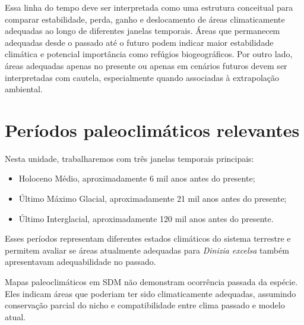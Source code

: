 Essa linha do tempo deve ser interpretada como uma estrutura conceitual para
comparar estabilidade, perda, ganho e deslocamento de áreas climaticamente
adequadas ao longo de diferentes janelas temporais. Áreas que permanecem
adequadas desde o passado até o futuro podem indicar maior estabilidade
climática e potencial importância como refúgios biogeográficos. Por outro lado,
áreas adequadas apenas no presente ou apenas em cenários futuros devem ser
interpretadas com cautela, especialmente quando associadas à extrapolação
ambiental.

\begin{center}
\end{center}

\section{Períodos paleoclimáticos relevantes}

Nesta unidade, trabalharemos com três janelas temporais principais:

\begin{itemize}
	\item Holoceno Médio, aproximadamente 6 mil anos antes do presente;
	\item Último Máximo Glacial, aproximadamente 21 mil anos antes do presente;
	\item Último Interglacial, aproximadamente 120 mil anos antes do presente.
\end{itemize}

Esses períodos representam diferentes estados climáticos do sistema terrestre e permitem avaliar se áreas atualmente adequadas para \textit{Dinizia excelsa} também apresentavam adequabilidade no passado.

\begin{atencao}[title={\faExclamationTriangle\quad Projeções paleoclimáticas são hipóteses}]
	Mapas paleoclimáticos em SDM não demonstram ocorrência passada da espécie. Eles indicam áreas que poderiam ter sido climaticamente adequadas, assumindo conservação parcial do nicho e compatibilidade entre clima passado e modelo atual.
\end{atencao}

